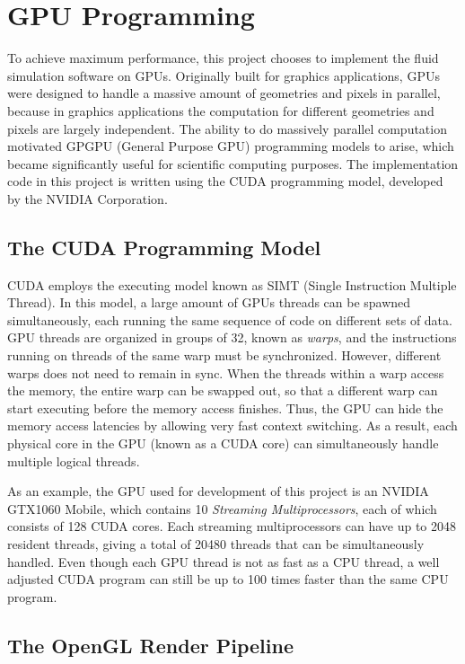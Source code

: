 \chapter{GPU Programming}

To achieve maximum performance, this project chooses to implement the fluid simulation software on GPUs. Originally built for graphics applications, GPUs were designed to handle a massive amount of geometries and pixels in parallel, because in graphics applications the computation for different geometries and pixels are largely independent. The ability to do massively parallel computation motivated GPGPU (General Purpose GPU) programming models to arise, which became significantly useful for scientific computing purposes. The implementation code in this project is written using the CUDA programming model, developed by the NVIDIA Corporation.

\section{The CUDA Programming Model}
CUDA employs the executing model known as SIMT (Single Instruction Multiple Thread). In this model, a large amount of GPUs threads can be spawned simultaneously, each running the same sequence of code on different sets of data. GPU threads are organized in groups of 32, known as \textit{warps}, and the instructions running on threads of the same warp must be synchronized. However, different warps does not need to remain in sync. When the threads within a warp access the memory, the entire warp can be swapped out, so that a different warp can start executing before the memory access finishes. Thus, the GPU can hide the memory access latencies by allowing very fast context switching. As a result, each physical core in the GPU (known as a CUDA core) can simultaneously handle multiple logical threads.

As an example, the GPU used for development of this project is an NVIDIA GTX1060 Mobile, which contains 10 \textit{Streaming Multiprocessors}, each of which consists of 128 CUDA cores. Each streaming multiprocessors can have up to 2048 resident threads, giving a total of 20480 threads that can be simultaneously handled. Even though each GPU thread is not as fast as a CPU thread, a well adjusted CUDA program can still be up to 100 times faster than the same CPU program.






\section{The OpenGL Render Pipeline}
\label{section opengl}

